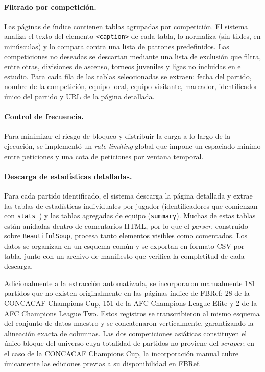 \paragraph{Filtrado por competici\'on.} Las p\'aginas de \'indice contienen tablas agrupadas por competici\'on. El sistema analiza el texto del elemento \texttt{<caption>} de cada tabla, lo normaliza (sin tildes, en min\'usculas) y lo compara contra una lista de patrones predefinidos. Las competiciones no deseadas se descartan mediante una lista de exclusi\'on que filtra, entre otras, divisiones de ascenso, torneos juveniles y ligas no incluidas en el estudio. Para cada fila de las tablas seleccionadas se extraen: fecha del partido, nombre de la competici\'on, equipo local, equipo visitante, marcador, identificador \'unico del partido y URL de la p\'agina detallada.

\paragraph{Control de frecuencia.} Para minimizar el riesgo de bloqueo y distribuir la carga a lo largo de la ejecuci\'on, se  implement\'o un \textit{rate limiting} global que impone un espaciado m\'inimo entre peticiones y una cota de peticiones por ventana temporal.

\paragraph{Descarga de estad\'isticas detalladas.} Para cada partido identificado, el sistema descarga la p\'agina detallada y extrae las tablas de estad\'isticas individuales por jugador (identificadores que comienzan con \texttt{stats\_}) y las tablas agregadas de equipo (\texttt{summary}). Muchas de estas tablas est\'an anidadas dentro de comentarios HTML, por lo que el \textit{parser}, construido sobre \texttt{BeautifulSoup}, procesa tanto elementos visibles como comentados. Los datos se organizan en un esquema com\'un y se exportan en formato CSV por tabla, junto con un archivo de manifiesto que verifica la completitud de cada descarga.

Adicionalmente a la extracci\'on automatizada, se incorporaron manualmente 181 partidos que no existen originalmente en las p\'aginas \'indice de FBRef: 28 de la CONCACAF Champions Cup, 151 de la AFC Champions League Elite y 2 de la AFC Champions League Two. Estos registros se transcribieron al mismo esquema del conjunto de datos maestro y se concatenaron verticalmente, garantizando la alineaci\'on exacta de columnas. Las dos competiciones asi\'aticas constituyen el \'unico bloque del universo cuya totalidad de partidos no proviene del \textit{scraper}; en el caso de la CONCACAF Champions Cup, la incorporaci\'on manual cubre \'unicamente las ediciones previas a su disponibilidad en FBRef.

